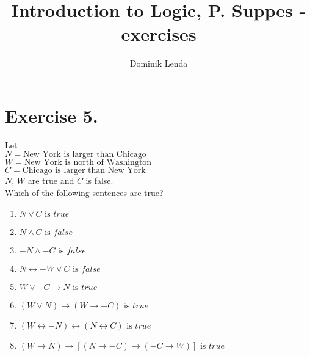 \documentclass{article}
\title{Introduction to Logic, P. Suppes - exercises}
\author{Dominik Lenda}
\begin{document}
\maketitle
\section*{Exercise 5.}
Let\\
$N = \text{New York is larger than Chicago}$\\
$W = \text{New York is north of Washington}$\\
$C = \text{Chicago is larger than New York}$\\
$N$, $W$ are true and $C$ is false.\\
Which of the following sentences are true?
\medskip
\begin{enumerate}[label=(\alph*)]
\item $N \vee C \text{ is } true$
\item $N \wedge C \text{ is } false$
\item $-N \wedge -C \text{ is } false$
\item $N \leftrightarrow -W \vee C \text{ is } false$
\item $W \vee -C \rightarrow N \text{ is } true$
\item $(W \vee N) \rightarrow (W \rightarrow -C) \text{ is } true$
\item $(W \leftrightarrow -N) \leftrightarrow (N \leftrightarrow C) \text{ is } true$
\item $(W \rightarrow N) \rightarrow [(N \rightarrow -C) \rightarrow (-C \rightarrow W)] \text{ is } true$
\end{enumerate}
\end{document}
